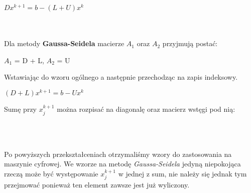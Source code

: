 \documentclass{article}
\begin{document}
  \begin{center}
    \large  $Dx^{k+1} = b - (L+U)x^{k}$ \\
     \\
     \\

  \end{center}

  Dla metody \textbf{Gaussa-Seidela} macierze $A_1$ oraz $A_2$ przyjmują postać:

  \begin{center}
    \large  $A_1$ = D + L, \qquad \qquad $A_2$ = U
  \end{center}

  Wstawiając do wzoru ogólnego a następnie przechodząc na zapis indeksowy.

  \begin{center}
    \large  $(D+L)x^{k+1} = b - Ux^{k}$ \\
    \begin{flushleft}
      \normalsize Sumę przy $x_{j}^{k+1}$ można rozpisać na diagonalę oraz macierz wstęgi pod nią:
    \end{flushleft}
     \\
     \\
  \end{center}

  Po powyższych przekształceniach otrzymaliśmy wzory do zastosowania na maszynie cyfrowej. We wzorze na metodę \textit{Gaussa-Seidela} jedyną niepokojąca rzeczą może być występowanie $x_{j}^{k+1}$ w jednej z sum, nie należy się jednak tym przejmować ponieważ ten element zawsze jest już wyliczony.
\end{document}
